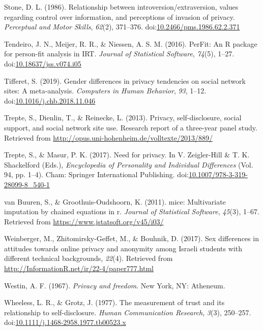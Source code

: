 \documentclass[man,floatsintext]{apa6}
\begin{document}
\leavevmode\hypertarget{ref-Stone.1986}{}%
Stone, D. L. (1986). Relationship between introversion/extraversion, values regarding control over information, and perceptions of invasion of privacy. \emph{Perceptual and Motor Skills}, \emph{62}(2), 371--376. doi:\href{https://doi.org/10.2466/pms.1986.62.2.371}{10.2466/pms.1986.62.2.371}

\leavevmode\hypertarget{ref-R-PerFit}{}%
Tendeiro, J. N., Meijer, R. R., \& Niessen, A. S. M. (2016). PerFit: An R package for person-fit analysis in IRT. \emph{Journal of Statistical Software}, \emph{74}(5), 1--27. doi:\href{https://doi.org/10.18637/jss.v074.i05}{10.18637/jss.v074.i05}

\leavevmode\hypertarget{ref-Tifferet.2019}{}%
Tifferet, S. (2019). Gender differences in privacy tendencies on social network sites: A meta-analysis. \emph{Computers in Human Behavior}, \emph{93}, 1--12. doi:\href{https://doi.org/10.1016/j.chb.2018.11.046}{10.1016/j.chb.2018.11.046}

\leavevmode\hypertarget{ref-Trepte.2013a}{}%
Trepte, S., Dienlin, T., \& Reinecke, L. (2013). Privacy, self-disclosure, social support, and social network site use. Research report of a three-year panel study. Retrieved from \url{http://opus.uni-hohenheim.de/volltexte/2013/889/}

\leavevmode\hypertarget{ref-Trepte.2017d}{}%
Trepte, S., \& Masur, P. K. (2017). Need for privacy. In V. Zeigler-Hill \& T. K. Shackelford (Eds.), \emph{Encyclopedia of Personality and Individual Differences} (Vol. 94, pp. 1--4). Cham: Springer International Publishing. doi:\href{https://doi.org/10.1007/978-3-319-28099-8_540-1}{10.1007/978-3-319-28099-8\_540-1}

\leavevmode\hypertarget{ref-R-mice}{}%
van Buuren, S., \& Groothuis-Oudshoorn, K. (2011). mice: Multivariate imputation by chained equations in r. \emph{Journal of Statistical Software}, \emph{45}(3), 1--67. Retrieved from \url{https://www.jstatsoft.org/v45/i03/}

\leavevmode\hypertarget{ref-Weinberger.2017b}{}%
Weinberger, M., Zhitomirsky-Geffet, M., \& Bouhnik, D. (2017). Sex differences in attitudes towards online privacy and anonymity among Israeli students with different technical backgrounds, \emph{22}(4). Retrieved from \url{http://InformationR.net/ir/22-4/paper777.html}

\leavevmode\hypertarget{ref-Westin.1967}{}%
Westin, A. F. (1967). \emph{Privacy and freedom}. New York, NY: Atheneum.

\leavevmode\hypertarget{ref-Wheeless.1977}{}%
Wheeless, L. R., \& Grotz, J. (1977). The measurement of trust and its relationship to self-disclosure. \emph{Human Communication Research}, \emph{3}(3), 250--257. doi:\href{https://doi.org/10.1111/j.1468-2958.1977.tb00523.x}{10.1111/j.1468-2958.1977.tb00523.x}
\end{document}
